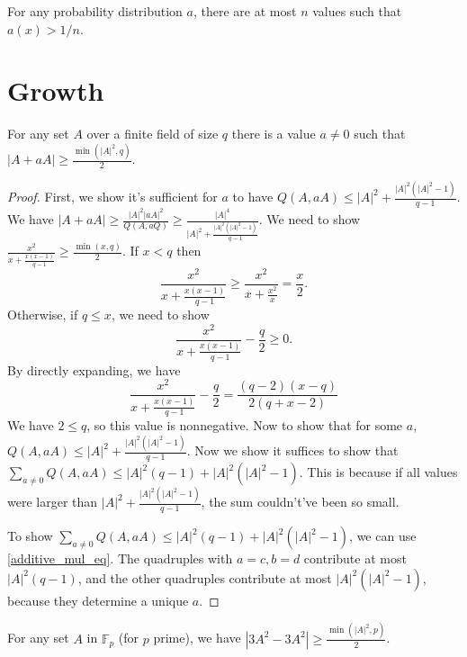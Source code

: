 \begin{proposition}
    \label{filter_neg_le_inv_card_le}
    \leanok
    For any probability distribution $a$, there are at most $n$ values such that $a(x) > 1/n$.
\end{proposition}

\chapter{Growth}
\label{chap:growth}

\begin{theorem}
    \label{exists_grower}
    \leanok
    For any set $A$ over a finite field of size $q$ there is a value $a \neq 0$ such that
    $|A + a A| \geq \frac{\min(|A|^2, q)}2$.
\end{theorem}

\begin{proof}
    \leanok
    First, we show it's sufficient for $a$ to have $Q(A, aA) \leq |A|^2 + \frac{|A|^2 (|A|^2 - 1)}{q-1}$.
    We have $|A + a A| \geq \frac{|A|^2 |a A|^2}{Q(A, aQ)} \geq \frac{|A|^4}{|A|^2 + \frac{|A|^2 (|A|^2 - 1)}{q-1}}$.
    We need to show $\frac{x^2}{x + \frac{x(x-1)}{q-1}} \geq \frac{\min(x, q)}2$.
    If $x < q$ then
    $$\frac{x^2}{x + \frac{x (x - 1)}{q-1}} \geq \frac{x^2}{x + \frac{x^2}{x}} = \frac x2.$$
    Otherwise, if $q \leq x$, we need to show
        $$ \frac{x^2}{x + \frac{x (x - 1)}{q-1}} - \frac q2 \geq 0. $$
    By directly expanding, we have
        $$\frac{x^2}{x + \frac{x (x - 1)}{q-1}} - \frac q2 = \frac{(q-2) (x - q)}{2 (q + x - 2)}$$
    We have $2 \leq q$, so this value is nonnegative.
    Now to show that for some $a$, $Q(A, aA) \leq |A|^2 + \frac{|A|^2 (|A|^2 - 1)}{q-1}$.
    Now we show it suffices to show that $\sum_{a \neq 0} Q(A, a A) \leq |A|^2 (q-1) + |A|^2 (|A|^2 - 1)$.
    This is because if all values were larger than $|A|^2 + \frac{|A|^2 (|A|^2 - 1)}{q-1}$, the sum couldn't've been so small.

    To show $\sum_{a \neq 0} Q(A, a A) \leq |A|^2 (q-1) + |A|^2 (|A|^2 - 1)$, we can use \ref{additive_mul_eq}.
    The quadruples with $a = c, b = d$ contribute at most $|A|^2 (q-1)$, and the other quadruples contribute at most
    $|A|^2 (|A|^2 - 1)$, because they determine a unique $a$.
\end{proof}

\begin{theorem}
    \label{GUS}
    \leanok
    For any set $A$ in $\mathbb{F}_p$ (for $p$ prime), we have $|3 A^2 - 3 A^2| \geq \frac{\min(|A|^2, p)}2$.
\end{theorem}

